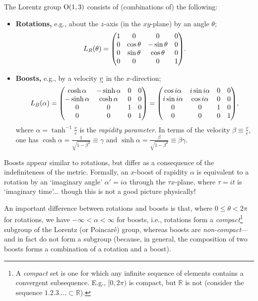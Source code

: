 The Lorentz group $\mathrm{O}(1,3)$ consists of (combinations of) the following:
\begin{itemize}
	\item \textbf{Rotations,} e.g., about the $z$-axis (in the $xy$-plane) by an angle $\theta$;
	\begin{align}
		L_R(\theta) = \mqty(
			1 & 0 & 0 & 0 \\
			0 & \cos\theta & -\sin\theta & 0 \\
			0 & \sin\theta & \cos\theta & 0 \\
			0 & 0 & 0 & 1 \\
		)
	.\end{align}
	
	\item \textbf{Boosts,} e.g., by a velocity $\uvec v$ in the $x$-direction;
	\begin{align}
		L_B(\alpha) = \mqty(
			\cosh\alpha & -\sinh\alpha & 0 & 0 \\
			-\sinh\alpha & \cosh\alpha & 0 & 0 \\
			0 & 0 & 1 & 0 \\
			0 & 0 & 0 & 1 \\
		) = \mqty(
			\cos i\alpha & i\sin i\alpha & 0 & 0 \\
			i\sin i\alpha & \cos i\alpha & 0 & 0 \\
			0 & 0 & 1 & 0 \\
			0 & 0 & 0 & 1 \\
		)
	,\end{align}
	where \begin{math}
		\alpha = \tanh^{-1}\frac{v}{c}
	\end{math}
	is the \textit{rapidity parameter}.
	In terms of the velocity $\beta \equiv \frac{v}{c}$, one has $\cosh\alpha = \frac1{\sqrt{1 - \beta^2}} \equiv \gamma$ and $\sinh\alpha = \frac{\beta}{\sqrt{1 - \beta^2}} \equiv \beta\gamma$.
\end{itemize}

\begin{note}
Boosts appear similar to rotations, but differ as a consequence of the indefiniteness of the metric.
Formally, an $x$-boost of rapidity $\alpha$ is equivalent to a rotation by an `imaginary angle' $\alpha' = i\alpha$ through the $\tau x$-plane, where $\tau = it$ is `imaginary time'... though this is not a good picture physically!
\end{note}
An important difference between rotations and boosts is that, where $0 \le \theta < 2\pi$ for rotations, we have $-\infty < \alpha < \infty$ for boosts, i.e., rotations form a \textit{compact}\footnote{A \textit{compact} set is one for which any infinite sequence of elements contains a convergent subsequence. E.g., $[0, 2\pi)$ is compact, but $\mathbb{R}$ is not (consider the sequence $\qty{1, 2, 3, ...} \subset \mathbb{R}$).} subgroup of the Lorentz (or Poincaré) group, whereas boosts are \textit{non-compact}---and in fact do not form a subgroup (because, in general, the composition of two boosts forms a combination of a rotation and a boost).

